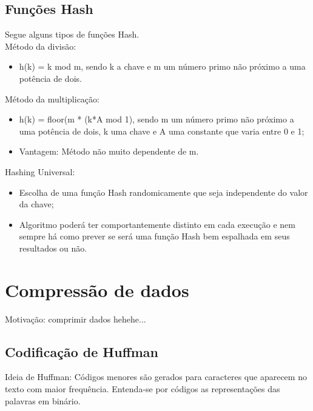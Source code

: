 \documentclass{article}
\begin{document}
\subsection{Funções Hash}

Segue alguns tipos de funções Hash.\\

Método da divisão:

\begin{itemize}
   \item h(k) = k mod m, sendo k a chave e m um número primo não próximo a uma potência de dois.
\end{itemize}

Método da multiplicação:

\begin{itemize}
   \item h(k) = floor(m * (k*A mod 1), sendo m um número primo não próximo a uma potência de dois, k
uma chave e A uma constante que varia entre 0 e 1;
   \item Vantagem: Método não muito dependente de m.
\end{itemize}

Hashing Universal:

\begin{itemize}
   \item Escolha de uma função Hash randomicamente que seja independente do valor da chave;
   \item Algoritmo poderá ter comportantemente distinto em cada execução e nem sempre há como prever
se será uma função Hash bem espalhada em seus resultados ou não.
\end{itemize}

\newpage

\section{Compressão de dados}

Motivação: comprimir dados hehehe...\\

\subsection{Codificação de Huffman}

Ideia de Huffman: Códigos menores são gerados para caracteres que aparecem no texto com maior
frequência. Entenda-se por códigos as representações das palavras em binário.\\
\end{document}
